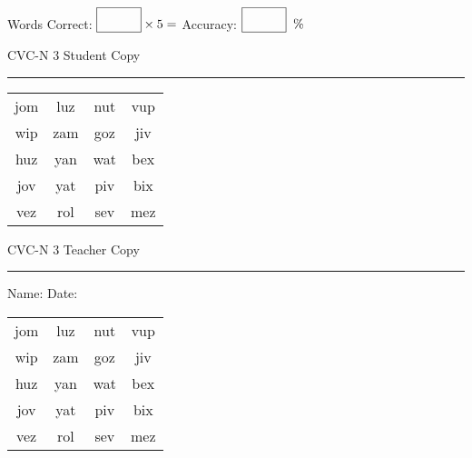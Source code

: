 \documentclass{memoir}
\begin{document}
\small

Words Correct: $\fbox{\phantom{\huge 100}} \times 5 = $ Accuracy: $\fbox{\phantom{\huge 100}}\;\; \%$ 

\vfill

\newpage


\footnotesize \noindent
CVC-N 3 \hfill Student Copy
\smallskip
\hrule

\Large

\setlength{\tabcolsep}{14pt}
\def\arraystretch{2}

{\selectfont


\begin{vplace}[0.5]
\begin{center}
\begin{tabular}{cccc}
jom & luz & nut & vup \\
wip & zam & goz & jiv \\
huz & yan & wat & bex \\
jov & yat & piv & bix \\
vez & rol & sev & mez \\
\end{tabular}
\end{center}
\end{vplace}

}

\newpage

\footnotesize \noindent
CVC-N 3 \hfill Teacher Copy
\smallskip
\hrule

\small

\vfill

\noindent
Name: \underline{\hspace{1.75in}} \hfill Date: \underline{\hspace{1in}}

\Large

{\selectfont


\begin{vplace}[0.5]
\begin{center}
\begin{tabular}{cccc}
jom & luz & nut & vup \\
wip & zam & goz & jiv \\
huz & yan & wat & bex \\
jov & yat & piv & bix \\
vez & rol & sev & mez \\
\end{tabular}
\end{center}
\end{vplace}



}
\end{document}
